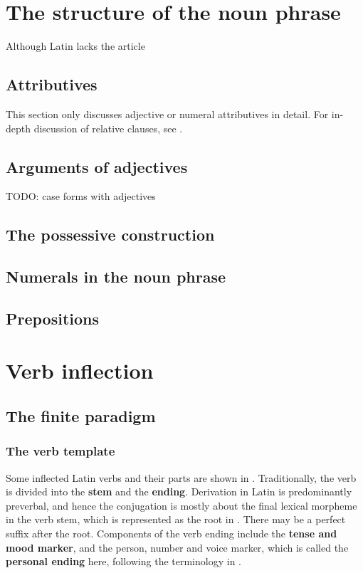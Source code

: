\documentclass[a4paper, oneside]{report}
\newcommand*{\citesec}[1]{\S~{#1}}
\newcommand*{\concept}[1]{\textbf{#1}}
\begin{document}
\chapter{The structure of the noun phrase}

Although Latin lacks the article 

\section{Attributives}

This section only discusses adjective or numeral attributives in detail.
For in-depth discussion of relative clauses, see .

\section{Arguments of adjectives}

TODO: case forms with adjectives

\section{The possessive construction}

\section{Numerals in the noun phrase}

\section{Prepositions}

\chapter{Verb inflection}

\section{The finite paradigm}

\subsection{The verb template}

Some inflected Latin verbs and their parts are shown in .
Traditionally, the verb is divided 
into the \concept{stem} and the \concept{ending}.
Derivation in Latin is predominantly preverbal,
and hence the conjugation is mostly about the final lexical morpheme in the verb stem,
which is represented as the root in .
There may be a perfect suffix after the root.
Components of the verb ending include 
the \concept{tense and mood marker},
and the person, number and voice marker,
which is called the \concept{personal ending} here, 
following the terminology in \citet[\citesec{165}]{allen1903allen}.
\end{document}
